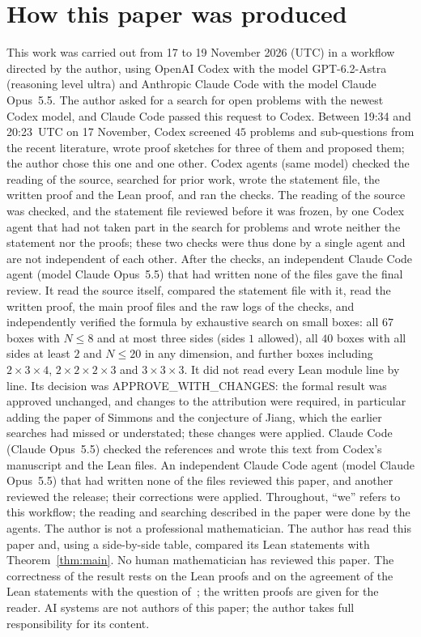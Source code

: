 \documentclass[11pt]{article}
\theoremstyle{remark}
\begin{document}
\section*{How this paper was produced}
This work was carried out from 17 to 19 November 2026 (UTC) in a workflow
directed by the author, using OpenAI Codex with the model GPT-6.2-Astra
(reasoning level ultra) and Anthropic Claude Code with the model Claude
Opus~5.5. The author asked for a search for open problems with the newest
Codex model, and Claude Code passed this request to Codex. Between 19:34 and
20:23~UTC on 17 November, Codex screened $45$ problems and sub-questions from
the recent literature, wrote proof sketches for three of them and proposed
them; the author chose this one and one other. Codex agents (same model) checked the reading of the
source, searched for prior work, wrote the statement file, the written proof
and the Lean proof, and ran the checks. The reading of the source was checked,
and the statement file reviewed before it was frozen, by one Codex agent that
had not taken part in the search for problems and wrote neither the statement
nor the proofs; these two checks were thus done by a single agent and are not
independent of each other. After the checks, an independent Claude Code agent (model
Claude Opus~5.5) that had written none of the files gave the final review. It
read the source itself, compared the statement file with it, read the written
proof, the main proof files and the raw logs of the checks, and independently
verified the formula by exhaustive search on small boxes: all $67$ boxes with
$N\le8$ and at most three sides (sides $1$ allowed), all $40$ boxes with all sides at least $2$ and
$N\le20$ in any dimension, and further boxes including $2\times3\times4$,
$2\times2\times2\times3$ and $3\times3\times3$. It did not read every Lean
module line by line. Its decision was APPROVE\_WITH\_CHANGES: the formal
result was approved unchanged, and changes to the attribution were required,
in particular adding the paper of Simmons and the conjecture of Jiang, which
the earlier searches had missed or understated; these changes were applied.
Claude Code (Claude Opus~5.5) checked the references and wrote this text from
Codex's manuscript and the Lean files. An independent Claude Code agent (model Claude Opus~5.5) that had written none of the files reviewed this paper, and another reviewed the release; their corrections were applied. Throughout, ``we'' refers
to this workflow; the reading and searching described in the paper were done
by the agents. The author is not a professional mathematician. The author has read this paper and, using a side-by-side table,
compared its Lean statements with Theorem~\ref{thm:main}.
No human mathematician has reviewed this paper. The correctness of the result
rests on the Lean proofs and on the agreement of the Lean statements with the
question of~\cite{yuan}; the written proofs are given for the reader. AI
systems are not authors of this paper; the author takes full responsibility
for its content.
\end{document}
